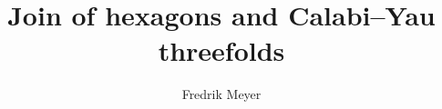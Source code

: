 \documentclass[a4paper]{memoir}
\title{Join of hexagons and Calabi--Yau threefolds}
\author
{
    Fredrik Meyer
}
\begin{document}
    \frontmatter        %

    \uiotitle

    

    \tableofcontents*    %

    

    \mainmatter         %


    
    
    
        

    \appendix           %
    \appendixpage       %

    
    

    \backmatter         %

    \printbibliography
\end{document}
